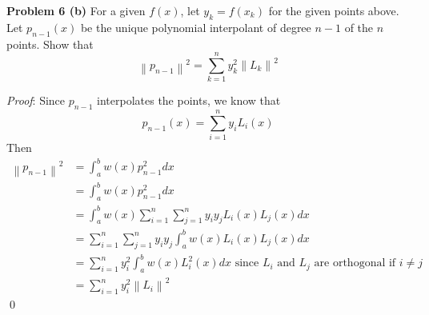 \documentclass[12pt]{article}
\newcommand{\problem}[1]{\hspace{-4 ex} \large \textbf{Problem #1} }
\newcommand{\norm}[1]{\left\lVert#1\right\rVert}
\renewenvironment{proof}{\hspace{-4 ex} \emph{Proof}:}{\qed}
\begin{document}
\bigbreak
\problem{6 (b)} For a given $f(x)$, let $y_k = f(x_k)$ for the given points above. Let $p_{n-1}(x)$ be the unique polynomial interpolant of degree $n-1$ of the $n$ points. Show that 
$$
\norm{p_{n-1}}^2 = \sum_{k=1}^n y_k^2 \norm{L_k}^2
$$

	\begin{proof}
		Since $p_{n-1}$ interpolates the points, we know that 
		$$
		p_{n-1}(x) = \sum_{i=1}^n y_i L_i(x)
		$$
		Then
		\begin{align*}
			\norm{p_{n-1}}^2 & = \int_a^b w(x)p_{n-1}^2 dx \\
			& = \int_a^b w(x)p_{n-1}^2 dx \\
			& = \int_a^b w(x) \sum_{i=1}^n \sum_{j=1}^n y_iy_j L_i(x)L_j(x) dx \\
			& = \sum_{i=1}^n \sum_{j=1}^n y_iy_j \int_a^b w(x)   L_i(x)L_j(x) dx \\
			& = \sum_{i=1}^n y_i^2 \int_a^b w(x)   L_i^2(x) dx \text{\ \ \ since $L_i$ and $L_j$ are orthogonal if $i \neq j$}\\
			& = \sum_{i=1}^n y_i^2 \norm{L_i}^2
		\end{align*}
	\end{proof}

		
\end{document}
